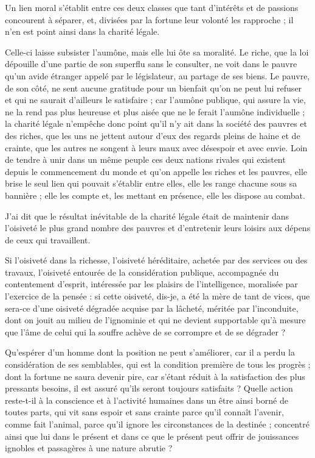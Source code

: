 \documentclass[french,twoside]{book} %
\begin{document}
\noindent Un lien moral s’établit entre ces deux classes que tant d’intérêts et de passions concourent à séparer, et, divisées par la fortune leur volonté les rapproche ; il n’en est point ainsi dans la charité légale.\par
Celle-ci laisse subsister l’aumône, mais elle lui ôte sa moralité. Le riche, que la loi dépouille d’une partie de son superflu sans le consulter, ne voit dans le pauvre qu’un avide étranger appelé par le législateur, au partage de ses biens. Le pauvre, de son côté, ne sent aucune gratitude pour un bienfait qu’on ne peut lui refuser et qui ne saurait d’ailleurs le satisfaire ; car l’aumône publique, qui assure la vie, ne la rend pas plus heureuse et plus aisée que ne le ferait l’aumône individuelle ; la charité légale n’empêche donc point qu’il n’y ait dans la société des pauvres et des riches, que les uns ne jettent autour d’eux des regards pleins de haine et de crainte, que les autres ne songent à leurs maux avec désespoir et avec envie. Loin de tendre à unir dans un même peuple ces deux nations rivales qui existent depuis le commencement du monde et qu’on appelle les riches et les pauvres, elle brise le seul lien qui pouvait s’établir entre elles, elle les range chacune sous sa bannière ; elle les compte et, les mettant en présence, elle les dispose au combat.\par
\bigbreak
\noindent J'ai dit que le résultat inévitable de la charité légale était de maintenir dans l’oisiveté le plus grand nombre des pauvres et d’entretenir leurs loisirs aux dépens de ceux qui travaillent.\par
Si l’oisiveté dans la richesse, l’oisiveté héréditaire, achetée par des services ou des travaux, l’oisiveté entourée de la considération publique, accompagnée du contentement d’esprit, intéressée par les plaisirs de l’intelligence, moralisée par l’exercice de la pensée : si cette oisiveté, dis-je, a été la mère de tant de vices, que sera-ce d’une oisiveté dégradée acquise par la lâcheté, méritée par l’inconduite, dont on jouit au milieu de l’ignominie et qui ne devient supportable qu’à mesure que l’âme de celui qui la souffre achève de se corrompre et de se dégrader ?\par
Qu'espérer d’un homme dont la position ne peut s’améliorer, car il a perdu la considération de ses semblables, qui est la condition première de tous les progrès ; dont la fortune ne saura devenir pire, car s’étant réduit à la satisfaction des plus pressants besoins, il est assuré qu’ils seront toujours satisfaits ? Quelle action reste-t-il à la conscience et à l’activité humaines dans un être ainsi borné de toutes parts, qui vit sans espoir et sans crainte parce qu’il connaît l’avenir, comme fait l’animal, parce qu’il ignore les circonstances de la destinée ; concentré ainsi que lui dans le présent et dans ce que le présent peut offrir de jouissances ignobles et passagères à une nature abrutie ?\par
\end{document}
